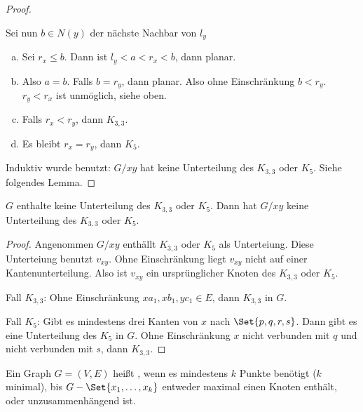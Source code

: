 \begin{st}[Kuratowski, 1930]
\begin{proof}
\begin{enumerate}[1)]
                Sei nun $b \in N(y)$ der nächste Nachbar von $l_y$
                \begin{enumerate}[a)]
                    \item
                        Sei $r_x \le b$.
                        Dann ist $l_y < a < r_x < b$, dann planar.
                    \item
                        Also $a = b$.
                        Falls $b = r_y$, dann planar.
                        Also ohne Einschränkung $b < r_y$.
                        $r_y < r_x$ ist unmöglich, siehe oben.
                    \item
                        Falls $r_x < r_y$, dann $K_{3,3}$.
                    \item
                        Es bleibt $r_x = r_y$, dann $K_5$.
                \end{enumerate}
        \end{enumerate}
        Induktiv wurde benutzt: $G / xy$ hat keine Unterteilung des $K_{3,3}$ oder $K_5$.
        Siehe folgendes Lemma.
    \end{proof}
\end{st}

\begin{lem}
    $G$ enthalte keine Unterteilung des $K_{3,3}$ oder $K_5$.
    Dann hat $G / xy$ keine Unterteilung des $K_{3,3}$ oder $K_5$.
    \begin{proof}
        Angenommen $G / xy$ enthällt $K_{3,3}$ oder $K_5$ als Unterteiung.
        Diese Unterteiung benutzt $v_{xy}$.
        Ohne Einschränkung liegt $v_{xy}$ nicht auf einer Kantenunterteilung.
        Also ist $v_{xy}$ ein ursprünglicher Knoten des $K_{3,3}$ oder $K_5$.

        Fall $K_{3,3}$:
        Ohne Einschränkung $xa_1, xb_1, yc_1 \in E$, dann $K_{3,3}$ in $G$.

        Fall $K_5$:
        Gibt es mindestens drei Kanten von $x$ nach $\Set{p,q,r,s}$.
        Dann gibt es eine Unterteilung des $K_5$ in $G$.
        Ohne Einschränkung $x$ nicht verbunden mit $q$ und nicht verbunden mit $s$, dann $K_{3,3}$.
    \end{proof}
\end{lem}

\begin{df}
    Ein Graph $G = (V, E)$ heißt , wenn es mindestens $k$ Punkte benötigt ($k$ minimal), bis $G - \Set{x_1, \dotsc, x_k}$ entweder maximal einen Knoten enthält, oder unzusammenhängend ist.
\end{df}

